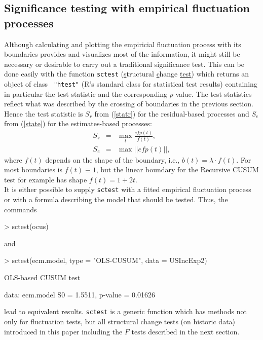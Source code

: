 \documentclass[10pt,a4paper]{article}
\begin{document}
\subsection{Significance testing with empirical fluctuation processes}

Although calculating and plotting the empiricial fluctuation process with its
boundaries provides and visualizes most of the information, it might still be
necessary or desirable to carry out a traditional significance test. This can be
done easily with the function {\tt sctest} (\underline{s}tructural
\underline{c}hange \underline{test}) which returns an object of class {\tt
"htest"} (\textsf{R}'s standard class for statistical test results) containing
in particular the test statistic and the corresponding $p$ value. The test
statistics reflect what was described by the crossing of boundaries in the
previous section. Hence the test statistic is $S_r$ from (\ref{statr}) for the
residual-based processes and $S_e$ from (\ref{state}) for the estimates-based
processes: \begin{eqnarray} \label{statr} S_r & = & \max_t
\frac{\mathit{efp}(t)}{f(t)},\\ \label{state} S_e & = & \max
||\mathit{efp}(t)||, \end{eqnarray}
where $f(t)$ depends on the shape of the boundary, i.e.,
$b(t) = \lambda \cdot f(t)$. For most boundaries is $f(t) \equiv 1$, but the
linear boundary for the Recursive CUSUM test for example has shape $f(t) = 1 + 
2t$.\\

It is either possible to supply {\tt sctest} with a fitted
empirical fluctuation process or with a formula describing the model that should
be tested. Thus, the commands
\begin{Schunk}
\begin{Sinput}
> sctest(ocus)
\end{Sinput}
\end{Schunk}
and
\begin{Schunk}
\begin{Sinput}
> sctest(ecm.model, type = "OLS-CUSUM", data = USIncExp2)
\end{Sinput}
\begin{Soutput}
	OLS-based CUSUM test

data:  ecm.model 
S0 = 1.5511, p-value = 0.01626
\end{Soutput}
\end{Schunk}
lead to equivalent results.
{\tt sctest} is a generic function which has methods not only for
fluctuation tests, but all
structural change tests (on historic data) introduced in this paper including
the $F$ tests described in the next section.
\end{document}
